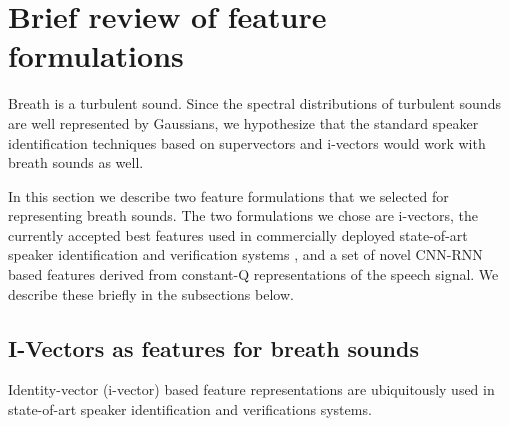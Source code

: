 \documentclass[a4paper]{article}
\begin{document}
\section{Brief review of feature formulations}\label{sec:feats}
Breath is a turbulent sound.
Since the spectral distributions of turbulent sounds are well represented by Gaussians, we hypothesize that the standard speaker identification techniques based on supervectors and i-vectors \cite{dehak2011front} would work with breath sounds as well. 



In this section we describe two feature formulations that we selected for representing breath sounds. The two formulations we chose are i-vectors, the currently accepted best features used in commercially deployed state-of-art speaker identification and verification systems  \cite{dehak2011front}, and a set of novel CNN-RNN based features derived from constant-Q representations of the speech signal. We describe these briefly in the subsections below. 

\subsection{I-Vectors as features for breath sounds}
Identity-vector (i-vector) based feature representations are ubiquitously used in state-of-art speaker identification and verifications systems.
\end{document}
